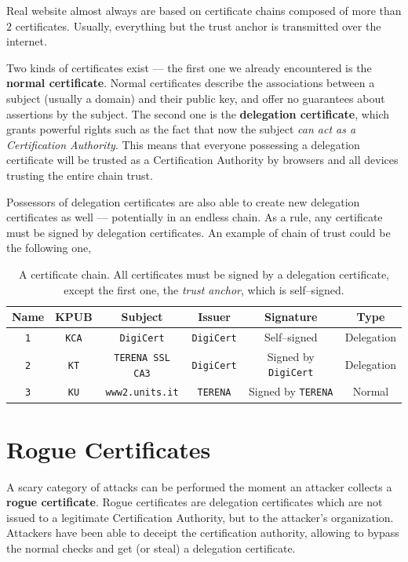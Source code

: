 \documentclass[10pt]{extreport}
\begin{document}
Real website almost always are based on certificate chains composed of more
than $2$ certificates. Usually, everything but the trust anchor is transmitted
over the internet.

Two kinds of certificates exist --- the first one we already encountered is the
\textbf{normal certificate}. Normal certificates describe the associations
between a subject (usually a domain) and their public key, and offer no
guarantees about assertions by the subject. The second one is the
\textbf{delegation certificate}, which grants powerful rights such as the fact
that now the subject \emph{can act as a Certification Authority}. This means
that everyone possessing a delegation certificate will be trusted as a
Certification Authority by browsers and all devices trusting the entire chain
trust.

Possessors of delegation certificates are also able to create new delegation
certificates as well --- potentially in an endless chain. As a rule, any
certificate must be signed by delegation certificates. An example of chain of
trust could be the following one,

\begin{table}[ht]
\centering
\begin{tabular}{cccccc}
    \textbf{Name} & \textbf{KPUB} & \textbf{Subject} & \textbf{Issuer} & \textbf{Signature} & \textbf{Type} \\
    \hline
    \texttt{1} & \texttt{KCA} & \texttt{DigiCert} & \texttt{DigiCert} & Self--signed  & Delegation \\
    \texttt{2} & \texttt{KT} & \texttt{TERENA SSL CA3} & \texttt{DigiCert} & Signed by \texttt{DigiCert} & Delegation \\
    \texttt{3} & \texttt{KU} & \texttt{www2.units.it} & \texttt{TERENA} & Signed by \texttt{TERENA} & Normal
\end{tabular}
\caption{A certificate chain. All certificates must be signed by a delegation
certificate, except the first one, the \emph{trust anchor}, which is
self--signed.}\label{tab:certificateChain1}
\end{table}
\bigskip

\section{Rogue Certificates}

A scary category of attacks can be performed the moment an attacker collects a
\textbf{rogue certificate}. Rogue certificates are delegation certificates
which are not issued to a legitimate Certification Authority, but to the
attacker's organization. Attackers have been able to deceipt the certification
authority, allowing to bypass the normal checks and get (or steal) a delegation
certificate.
\end{document}
